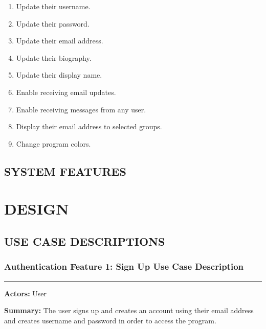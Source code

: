 \documentclass[twoside,letterpaper]{article}
\begin{document}
	\begin{enumerate}
		\item Update their username.
		\item Update their password.
		\item Update their email address.
		\item Update their biography.
		\item Update their display name.
		\item Enable receiving email updates.
		\item Enable receiving messages from any user.
		\item Display their email address to selected groups.
		\item Change program colors.
	\end{enumerate}
	
	\bigskip


\subsection[SYSTEM FEATURES]{\rmfamily\bfseries SYSTEM FEATURES}
\hypertarget{RefHeading21659017292}{}





\section[DESIGN]{\rmfamily\bfseries DESIGN}



\subsection[USE CASE DESCRIPTIONS]{\rmfamily\bfseries USE CASE DESCRIPTIONS}


	\subsubsection[Authentication Feature 1: Sign Up Use Case Description]{\rmfamily\bfseries\color{black}
	Authentication Feature 1: Sign Up Use Case Description}
	\hypertarget{RefHeading22059017292}{}
	\label{a:uc1}
	
	\vspace{2pt}
	\hrule
	\vspace{8pt}
	\textbf{Actors:} User \newline
	
	\noindent\textbf{Summary:} The user signs up and creates an account using their email address and creates username and password in order to access the program. \newline
	
\end{document}
